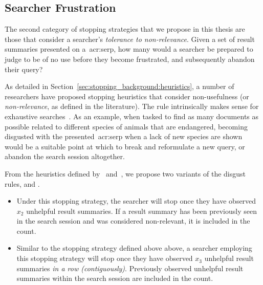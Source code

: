 \subsection{Searcher Frustration}
The second category of stopping strategies that we propose in this thesis are those that consider a searcher's \emph{tolerance to non-relevance}. Given a set of result summaries presented on a~\gls{acr:serp}, how many would a searcher be prepared to judge to be of no use before they become frustrated, and subsequently abandon their query?

As detailed in Section~\ref{sec:stopping_background:heuristics}, a number of researchers have proposed stopping heuristics that consider non-usefulness (or \emph{non-relevance}, as defined in the literature). The rule intrinsically makes sense for exhaustive searches~\cite{kraft1979stopping_rules}. As an example, when tasked to find as many documents as possible related to different species of animals that are endangered, becoming disgusted with the presented~\gls{acr:serp} when a lack of new species are shown would be a suitable point at which to break and reformulate a new query, or abandon the search session altogether.

From the heuristics defined by~\citealt{cooper1973retrieval_effectiveness_ii} and~\citealt{kraft1979stopping_rules}, we propose two variants of the disgust rules,  and .

\begin{itemize}
    
    \item[]{} Under this stopping strategy, the searcher will stop once they have observed $x_2$ unhelpful result summaries. If a result summary has been previously seen in the search session and was considered non-relevant, it is included in the count.
    
    \item[]{} Similar to the stopping strategy defined above above, a searcher employing this stopping strategy will stop once they have observed $x_3$ unhelpful result summaries \emph{in a row (contiguously)}. Previously observed unhelpful result summaries within the search session are included in the count.
    
\end{itemize}

